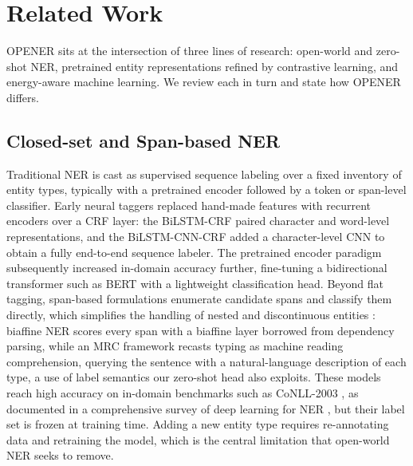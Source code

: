 \section{Related Work}
\label{sec:related}


OPENER sits at the intersection of three lines of research: open-world and zero-shot NER, pretrained entity representations refined by contrastive learning, and energy-aware machine learning.
We review each in turn and state how OPENER differs.

\subsection{Closed-set and Span-based NER}
\label{sec:related:closed}
Traditional NER is cast as supervised sequence labeling over a fixed inventory of entity types, typically with a pretrained encoder followed by a token or span-level classifier.
Early neural taggers replaced hand-made features with recurrent encoders over a CRF layer: the BiLSTM-CRF \cite{lample2016ner} paired character and word-level representations, and the BiLSTM-CNN-CRF \cite{ma2016end} added a character-level CNN to obtain a fully end-to-end sequence labeler.
The pretrained encoder paradigm subsequently increased in-domain accuracy further, fine-tuning a bidirectional transformer such as BERT \cite{devlin2019bert} with a lightweight classification head.
Beyond flat tagging, span-based formulations enumerate candidate spans and classify them directly, which simplifies the handling of nested and discontinuous entities \cite{nguyen2023span}: biaffine NER \cite{yu2020biaffine} scores every span with a biaffine layer borrowed from dependency parsing, while an MRC framework \cite{li2020mrc} recasts typing as machine reading comprehension, querying the sentence with a natural-language description of each type, a use of label semantics our zero-shot head also exploits.
These models reach high accuracy on in-domain benchmarks such as CoNLL-2003 \cite{tjongkimsang2003conll}, as documented in a comprehensive survey of deep learning for NER \cite{li2022survey}, but their label set is frozen at training time.
Adding a new entity type requires re-annotating data and retraining the model, which is the central limitation that open-world NER seeks to remove.

